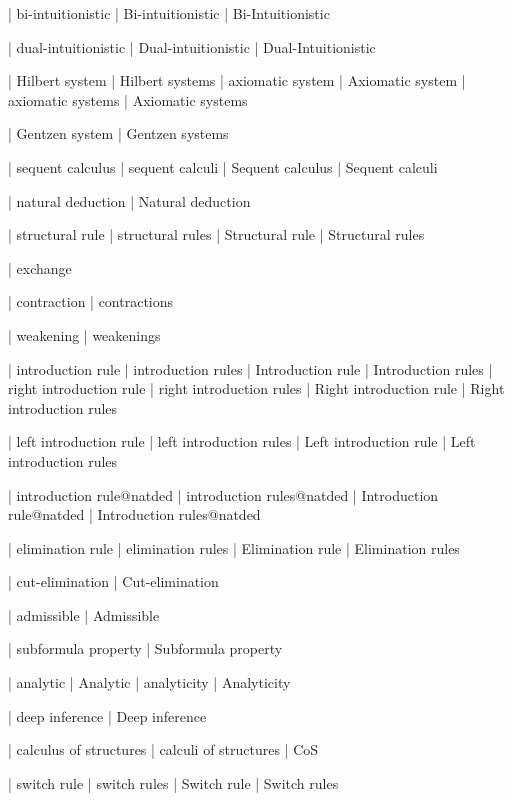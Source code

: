  | bi-intuitionistic
 | Bi-intuitionistic
 | Bi-Intuitionistic

 | dual-intuitionistic
 | Dual-intuitionistic
 | Dual-Intuitionistic

 | Hilbert system
 | Hilbert systems
 | axiomatic system
 | Axiomatic system
 | axiomatic systems
 | Axiomatic systems

 | Gentzen system
 | Gentzen systems

 | sequent calculus
 | sequent calculi
 | Sequent calculus
 | Sequent calculi

 | natural deduction
 | Natural deduction

 | structural rule
 | structural rules
 | Structural rule
 | Structural rules

 | exchange

 | contraction
 | contractions

 | weakening
 | weakenings

 | introduction rule
 | introduction rules
 | Introduction rule
 | Introduction rules
 | right introduction rule
 | right introduction rules
 | Right introduction rule
 | Right introduction rules

 | left introduction rule
 | left introduction rules
 | Left introduction rule
 | Left introduction rules

 | introduction rule@natded
 | introduction rules@natded
 | Introduction rule@natded
 | Introduction rules@natded

 | elimination rule
 | elimination rules
 | Elimination rule
 | Elimination rules

 | cut-elimination
 | Cut-elimination

 | admissible
 | Admissible

 | subformula property
 | Subformula property

 | analytic
 | Analytic
 | analyticity
 | Analyticity

 | deep inference
 | Deep inference

 | calculus of structures
 | calculi of structures
 | CoS
 
 | switch rule
 | switch rules
 | Switch rule
 | Switch rules
 
